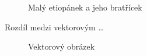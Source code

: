 \documentclass[11pt,a4paper]{article}
\begin{document}
\begin{center}
{}
\begin{figure}[h]\caption{Malý etiopánek a jeho bratřícek}\end{figure}
\end{center}


Rozdíl medzi vektorovým \ldots

\begin{center}
\begin{figure}[h]\caption{Vektorový obrázek}\end{figure}
\end{center}
\end{document}

